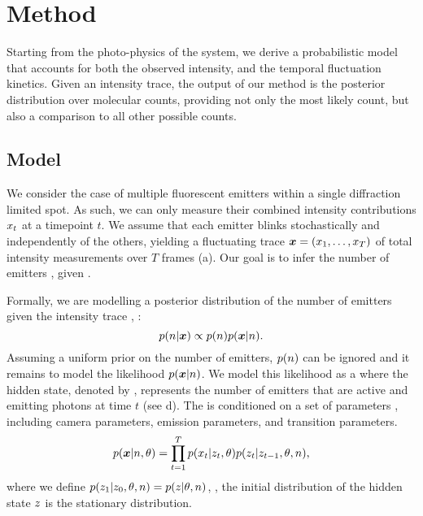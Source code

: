 \section{Method}

Starting from the photo-physics of the system, we derive a probabilistic model
that accounts for both the observed intensity, and the temporal fluctuation
kinetics.
  Given an intensity trace, the output of our method is the posterior
  distribution over molecular counts, providing not only the most likely count,
  but also a comparison to all other possible counts. 

\subsection{Model}

We consider the case of multiple fluorescent emitters within a single
diffraction limited spot.
%
  As such, we can only measure their combined intensity contributions
  $x_{t}$ at a timepoint $t$.
  We assume that each emitter blinks stochastically and independently of the
  others, yielding a fluctuating trace $\bm{x} = (x_{1},\ldots,x_{T})$ of total
  intensity measurements over $T$ frames (a).
  Our goal is to infer the number of emitters \n, given \trace.

Formally, we are modelling a posterior distribution of the
number of emitters \n given the intensity trace \trace, \ie:
  \begin{equation*}
    p(n | \bm{x}) \propto p(n) p(\bm{x} | n)
    \text{.}
  \end{equation*}
  Assuming a uniform prior on the number of emitters, $p(n)$ can be ignored
  and it remains to model the likelihood $p(\bm{x}|n)$.
  We model this likelihood as a \hmm where the hidden state, denoted by ,
  represents the number of emitters that are active and emitting photons at
  time $t$ (see d).
  The \hmm is conditioned on a set of parameters \parameters, including
    \parametersc camera parameters, \parameterse emission parameters, 
    and \parameterst transition parameters.
  \begin{equation}
    p(\bm{x}| n, \theta) =
      \prod_{t=1}^{T}
        p(x_{t} | z_{t}, \theta)
        p(z_{t} | z_{t-1}, \theta, n)
    \text{,}
    \label{eq:method:HMM}
  \end{equation}
  where we define $p(z_{1}|z_{0},\theta,n)=p(z_{}|\theta,n)$, \ie,
  the initial distribution of the hidden state $z_{}$ is the stationary
  distribution.

